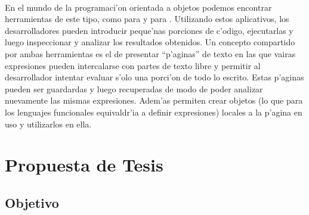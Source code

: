 \documentclass[a4paper]{article}
\begin{document}
\paragraph{}En el mundo de la programaci'on orientada a objetos podemos encontrar herramientas de este tipo, como  para  y  para .  Utilizando estos aplicativos, los desarrolladores pueden introducir peque'nas porciones de c'odigo, ejecutarlas y luego inspeccionar y analizar los resultados obtenidos.  Un concepto compartido por ambas herramientas es el de presentar ``p'aginas'' de texto en las que vairas expresiones pueden intercalarse con partes de texto libre y permitir al desarrollador intentar evaluar s'olo una porci'on de todo lo escrito.  Estas p'aginas pueden ser guardardas y luego recuperadas de modo de poder analizar nuevamente las mismas expresiones.  Adem'as permiten crear objetos (lo que para los lenguajes funcionales equivaldr'ia a definir expresiones) locales a la p'agina en uso y utilizarlos en ella.

\section{Propuesta de Tesis}
\subsection{Objetivo}
\end{document}
